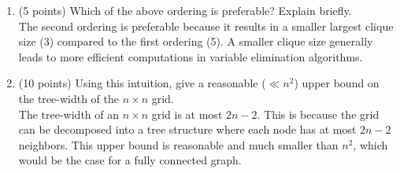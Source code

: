 \documentclass[a3paper,12pt]{extarticle} %
\begin{document}
\begin{enumerate}
\item (5 points) Which of the above ordering is preferable? Explain briefly.
\\ The second ordering is preferable because it results in a smaller largest clique size (3) compared to the first ordering (5). A smaller clique size generally leads to more efficient computations in variable elimination algorithms.

\item (10 points) Using this intuition, give a reasonable (\(\ll n^2\)) upper bound on the tree-width of the \(n \times n\) grid.
\\ The tree-width of an \(n \times n\) grid is at most \(2n - 2\). This is because the grid can be decomposed into a tree structure where each node has at most \(2n - 2\) neighbors. This upper bound is reasonable and much smaller than \(n^2\), which would be the case for a fully connected graph.
\end{enumerate}
\end{document}
